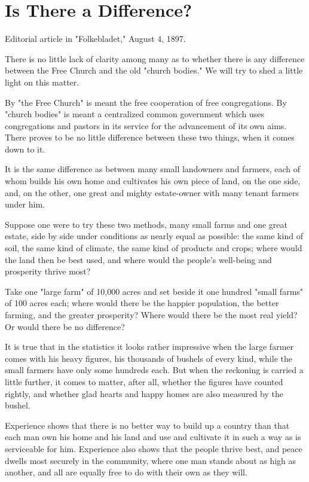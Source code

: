 
\section{Is There a Difference?}

Editorial article in "Folkebladet," August 4, 1897.

There is no little lack of clarity among many as to whether there is any difference between the Free Church and the old "church bodies." We will try to shed a little light on this matter.

By "the Free Church" is meant the free cooperation of free congregations. By "church bodies" is meant a centralized common government which uses congregations and pastors in its service for the advancement of its own aims. There proves to be no little difference between these two things, when it comes down to it.

It is the same difference as between many small landowners and farmers, each of whom builds his own home and cultivates his own piece of land, on the one side, and, on the other, one great and mighty estate-owner with many tenant farmers under him.

Suppose one were to try these two methods, many small farms and one great estate, side by side under conditions as nearly equal as possible: the same kind of soil, the same kind of climate, the same kind of products and crops; where would the land then be best used, and where would the people’s well-being and prosperity thrive most?

Take one "large farm" of 10,000 acres and set beside it one hundred "small farms" of 100 acres each; where would there be the happier population, the better farming, and the greater prosperity? Where would there be the most real yield? Or would there be no difference?

It is true that in the statistics it looks rather impressive when the large farmer comes with his heavy figures, his thousands of bushels of every kind, while the small farmers have only some hundreds each. But when the reckoning is carried a little further, it comes to matter, after all, whether the figures have counted rightly, and whether glad hearts and happy homes are also measured by the bushel.

Experience shows that there is no better way to build up a country than that each man own his home and his land and use and cultivate it in such a way as is serviceable for him. Experience also shows that the people thrive best, and peace dwells most securely in the community, where one man stands about as high as another, and all are equally free to do with their own as they will.

